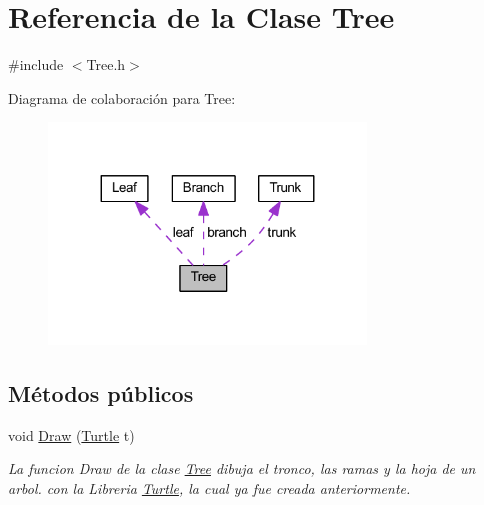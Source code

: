 \hypertarget{class_tree}{}\section{Referencia de la Clase Tree}
\label{class_tree}


{\ttfamily \#include $<$Tree.\+h$>$}



Diagrama de colaboración para Tree\+:
\nopagebreak
\begin{figure}[H]
\begin{center}
\leavevmode
\includegraphics[width=239pt]{class_tree__coll__graph}
\end{center}
\end{figure}
\subsection*{Métodos públicos}
\begin{DoxyCompactItemize}
\item 
void \mbox{\hyperlink{class_tree_a3dbf11ce8a221969b976bc0e5ba7f6af}{Draw}} (\mbox{\hyperlink{class_turtle}{Turtle}} t)
\begin{DoxyCompactList}\small\item\em La funcion Draw de la clase \mbox{\hyperlink{class_tree}{Tree}} dibuja el tronco, las ramas y la hoja de un arbol. con la Libreria \mbox{\hyperlink{class_turtle}{Turtle}}, la cual ya fue creada anteriormente. \end{DoxyCompactList}\end{DoxyCompactItemize}
